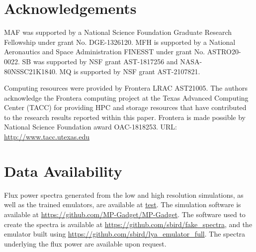 \documentclass[a4paper,11pt]{article}
\begin{document}
\section*{Acknowledgements}
MAF was supported by a National Science Foundation Graduate Research Fellowship under grant No. DGE-1326120. MFH is supported by a National Aeronautics and Space Administration FINESST under grant No. ASTRO20-0022. SB was supported by NSF grant AST-1817256 and NASA-80NSSC21K1840. MQ is supported by NSF grant AST-2107821.

Computing resources were provided by Frontera LRAC AST21005.
The authors acknowledge the Frontera computing project at the Texas Advanced Computing Center (TACC) for providing HPC and storage resources that have contributed to the research results reported within this paper.
Frontera is made possible by National Science Foundation award OAC-1818253.
URL: \url{http://www.tacc.utexas.edu}

\section*{Data Availability}

Flux power spectra generated from the low and high resolution simulations, as well as the trained emulators, are available at \url{test}. The simulation software is available at \url{https://github.com/MP-Gadget/MP-Gadget}. The software used to create the spectra is available at \url{https://github.com/sbird/fake_spectra}, and the emulator built using \url{https://github.com/sbird/lya_emulator_full}. The spectra underlying the flux power are available upon request.




\appendix

\label{lastpage}
\end{document}
